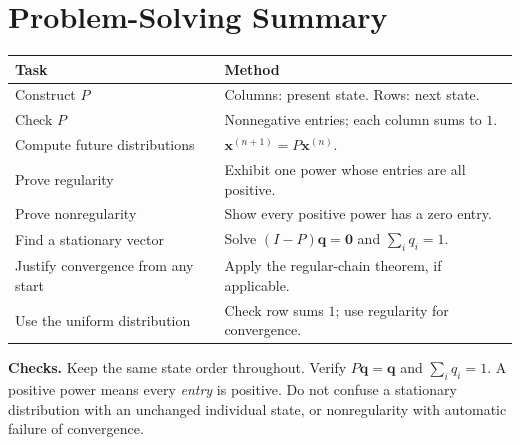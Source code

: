 \documentclass{article}
\theoremstyle{plain}
\theoremstyle{definition}
\theoremstyle{remark}
\renewcommand{\vec}[1]{\mathbf{#1}}
\begin{document}
\section*{Problem-Solving Summary}
\begin{center}
\renewcommand{\arraystretch}{1.5}
\begin{tabular}{l|l}
Task & Method\\\hline
Construct $P$ & Columns: present state. Rows: next state.\\
Check $P$ & Nonnegative entries; each column sums to $1$.\\
Compute future distributions & $\vec{x}^{(n+1)}=P\vec{x}^{(n)}$.\\
Prove regularity & Exhibit one power whose entries are all positive.\\
Prove nonregularity & Show every positive power has a zero entry.\\
Find a stationary vector & Solve $(I-P)\vec{q}=\vec{0}$ and $\sum_iq_i=1$.\\
Justify convergence from any start & Apply the regular-chain theorem, if applicable.\\
Use the uniform distribution & Check row sums $1$; use regularity for convergence.
\end{tabular}
\end{center}
\textbf{Checks.} Keep the same state order throughout. Verify $P\vec{q}=\vec{q}$ and $\sum_iq_i=1$. A positive power means every \emph{entry} is positive. Do not confuse a stationary distribution with an unchanged individual state, or nonregularity with automatic failure of convergence.
\end{document}
